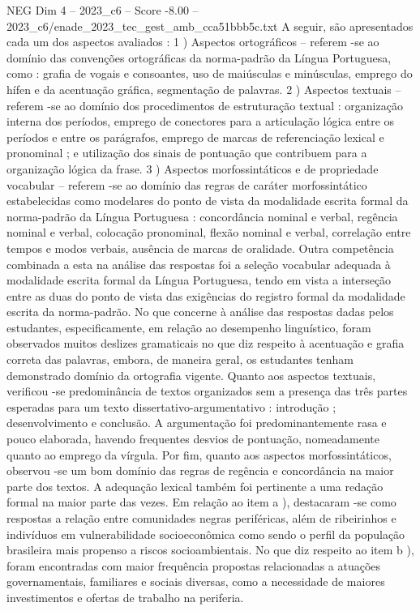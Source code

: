 \begin{textsample}{NEG Dim 4 – 2023\_c6 – Score -8.00 – 2023\_c6/enade\_2023\_tec\_gest\_amb\_cca51bbb5c.txt}
A seguir, são apresentados cada um dos aspectos avaliados : 1 ) Aspectos ortográficos – referem -se ao domínio das convenções ortográficas da norma-padrão da Língua Portuguesa, como : grafia de vogais e consoantes, uso de maiúsculas e minúsculas, emprego do hífen e da acentuação gráfica, segmentação de palavras. 2 ) Aspectos textuais – referem -se ao domínio dos procedimentos de estruturação textual : organização interna dos períodos, emprego de conectores para a articulação lógica entre os períodos e entre os parágrafos, emprego de marcas de referenciação lexical e pronominal ; e utilização dos sinais de pontuação que contribuem para a organização lógica da frase. 3 ) Aspectos morfossintáticos e de propriedade vocabular – referem -se ao domínio das regras de caráter morfossintático estabelecidas como modelares do ponto de vista da modalidade escrita formal da norma-padrão da Língua Portuguesa : concordância nominal e verbal, regência nominal e verbal, colocação pronominal, flexão nominal e verbal, correlação entre tempos e modos verbais, ausência de marcas de oralidade.
Outra competência combinada a esta na análise das respostas foi a seleção vocabular adequada à modalidade escrita formal da Língua Portuguesa, tendo em vista a interseção entre as duas do ponto de vista das exigências do registro formal da modalidade escrita da norma-padrão.
No que concerne à análise das respostas dadas pelos estudantes, especificamente, em relação ao desempenho linguístico, foram observados muitos deslizes gramaticais no que diz respeito à acentuação e grafia correta das palavras, embora, de maneira geral, os estudantes tenham demonstrado domínio da ortografia vigente.
Quanto aos aspectos textuais, verificou -se predominância de textos organizados sem a presença das três partes esperadas para um texto dissertativo-argumentativo : introdução ; desenvolvimento e conclusão.
A argumentação foi predominantemente rasa e pouco elaborada, havendo frequentes desvios de pontuação, nomeadamente quanto ao emprego da vírgula.
Por fim, quanto aos aspectos morfossintáticos, observou -se um bom domínio das regras de regência e concordância na maior parte dos textos.
A adequação lexical também foi pertinente a uma redação formal na maior parte das vezes.
Em relação ao item a ), destacaram -se como respostas a relação entre comunidades negras periféricas, além de ribeirinhos e indivíduos em vulnerabilidade socioeconômica como sendo o perfil da população brasileira mais propenso a riscos socioambientais.
No que diz respeito ao item b ), foram encontradas com maior frequência propostas relacionadas a atuações governamentais, familiares e sociais diversas, como a necessidade de maiores investimentos e ofertas de trabalho na periferia.

\end{textsample}
